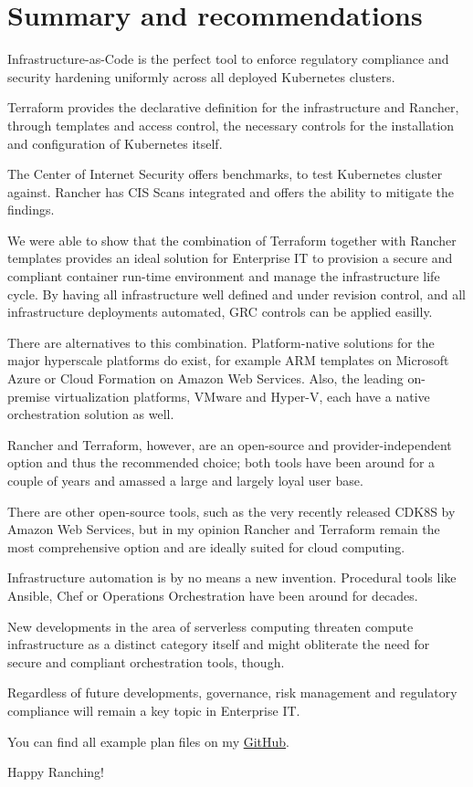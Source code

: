 %
%

\pagebreak
\section{Summary and recommendations}

\onehalfspacing

Infrastructure-as-Code is the perfect tool to enforce regulatory compliance and security hardening uniformly across all deployed Kubernetes clusters.

Terraform provides the declarative definition for the infrastructure and Rancher, through templates and access control, the necessary controls for the installation and configuration of Kubernetes itself.

The Center of Internet Security offers benchmarks, to test Kubernetes cluster against. Rancher has CIS Scans integrated and offers the ability to mitigate the findings.

We were able to show that the combination of Terraform together with Rancher templates provides an ideal solution for Enterprise IT to provision a secure and compliant container run-time environment and manage the infrastructure life cycle. By having all infrastructure well defined and under revision control, and all infrastructure deployments automated, GRC controls can be applied easilly. 

There are alternatives to this combination. Platform-native solutions for the major hyperscale platforms do exist, for example ARM templates on Microsoft Azure or Cloud Formation on Amazon Web Services. Also, the leading on-premise virtualization platforms, VMware and Hyper-V, each have a native orchestration solution as well.

Rancher and Terraform, however, are an open-source and provider-independent
option and thus the recommended choice; both tools have been around for a couple of years and amassed a large and largely loyal user base.

There are other open-source tools, such as the very recently released CDK8S by Amazon Web Services, but in my opinion Rancher and Terraform remain the most comprehensive option and are ideally suited for cloud computing.

Infrastructure automation is by no means a new invention. Procedural tools like Ansible, Chef or Operations Orchestration have been around for decades.

New developments in the area of serverless computing threaten compute infrastructure as a distinct category itself and might obliterate the need for secure and compliant orchestration tools, though.

Regardless of future developments, governance, risk management and regulatory compliance will remain a key topic in Enterprise IT.

You can find all example plan files on my  \href{https://github.com/chfrank-cgn/Rancher/tree/master/az-cluster-1}{GitHub}.

Happy Ranching!
